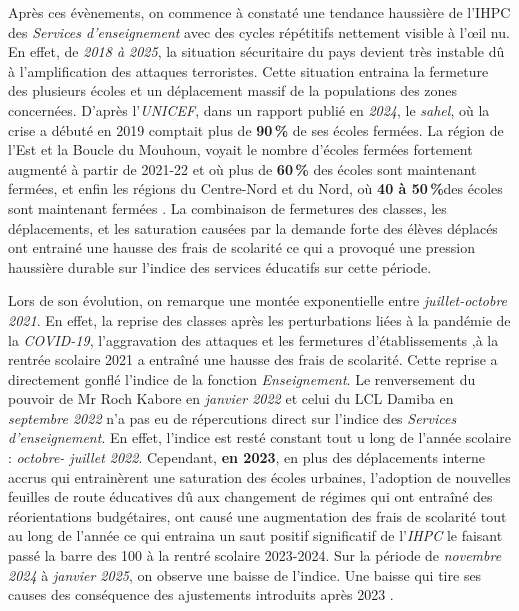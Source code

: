 \documentclass[
12pt,          %
a4paper,       %
oneside,       %
openright      %
]{report}
\newcommand{\IHPC}{\textit{IHPC}}
\begin{document}
 Après ces évènements, on commence à constaté une tendance haussière de l’IHPC  des \textit{Services d'enseignement} avec des cycles répétitifs nettement visible à l'œil nu. En effet, de \textit{2018 à 2025}, la situation sécuritaire du pays devient très instable dû à l'amplification des attaques terroristes. Cette situation entraina la fermeture des plusieurs écoles et un déplacement massif de la populations des zones concernées. D'après l'\textit{UNICEF}, dans un rapport publié en \textit{2024}, le \textit{sahel}, où la crise a débuté en 2019 comptait plus de \textbf{90\,\%} de ses écoles fermées. La région de l’Est et la Boucle du Mouhoun, voyait le nombre d’écoles fermées fortement augmenté à partir de 2021-22 et où plus de \textbf{60\,\%} des écoles sont maintenant fermées, et enfin les régions du Centre-Nord et du Nord, où \textbf{40 à 50\,\%}des écoles sont maintenant fermées \citep{unicef2025dms}. La combinaison de fermetures des classes, les déplacements, et les saturation causées par la demande forte des élèves déplacés ont entrainé une hausse des frais de scolarité ce qui a provoqué une pression haussière durable sur l’indice des services éducatifs sur cette période.
 
 Lors de son évolution, on remarque une montée exponentielle entre \textit{juillet-octobre 2021}. En effet, la reprise des classes après les perturbations liées à la pandémie de la \textit{COVID-19}, l'aggravation des attaques et les fermetures d’établissements ,à la rentrée scolaire 2021 a entraîné une hausse des frais de scolarité. Cette reprise a directement gonflé l’indice de la fonction \textit{Enseignement}.
 Le renversement du pouvoir de Mr Roch Kabore en \textit{janvier 2022} et celui du LCL Damiba en  \textit{septembre 2022} n'a pas eu de répercutions direct sur l'indice des \textit{Services d'enseignement}. En effet, l'indice est resté constant tout u long de l'année scolaire :  \textit{octobre- juillet 2022}.  Cependant, \textbf{en 2023}, en plus des déplacements interne accrus qui entrainèrent une saturation des écoles urbaines, l’adoption de nouvelles feuilles de route éducatives dû aux changement de régimes qui ont entraîné des réorientations budgétaires,  ont causé une augmentation des frais de scolarité tout au long de l'année ce qui entraina un saut positif significatif de l'\IHPC{} le faisant passé la barre des 100 à la rentré scolaire 2023-2024.
 Sur la période de \textit{novembre 2024} à \textit{janvier 2025}, on observe une baisse de l'indice. Une baisse qui tire ses causes des conséquence des ajustements introduits après 2023 .
 
\end{document}
